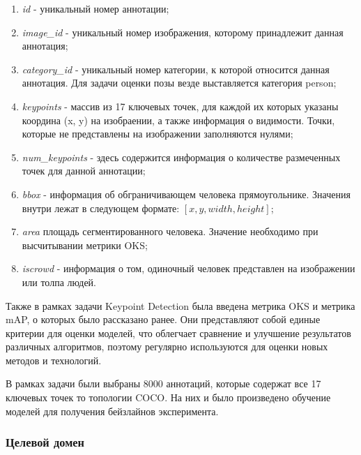 \begin{enumerate}

\item \textit{id} - уникальный номер аннотации;

\item \textit{image\_id} - уникальный номер изображения, которому принадлежит данная аннотация;

\item \textit{category\_id} - уникальный номер категории, к которой относится данная аннотация. Для задачи оценки позы везде выставляется категория person;

\item \textit{keypoints} - массив из 17 ключевых точек, для каждой их которых указаны координа (x, y) на изобраении, а также информация о видимости. Точки, которые не представлены на изображении заполняются нулями;

\item \textit{num\_keypoints} - здесь содержится информация о количестве размеченных точек для данной аннотации;

\item \textit{bbox} - информация об обграничивающем человека прямоугольнике. Значения внутри лежат в следующем формате: $[x, y, width, height]$;

\item \textit{area} площадь сегментированного человека. Значение необходимо при высчитывании метрики OKS;

\item \textit{iscrowd} - информация о том, одиночный человек представлен на изображении или толпа людей.

\end{enumerate}

Также в рамках задачи Keypoint Detection была введена метрика OKS и метрика mAP, о которых было рассказано ранее. Они представляют собой единые критерии для оценки моделей, что облегчает сравнение и улучшение результатов различных алгоритмов, поэтому регулярно используются для оценки  новых методов и технологий.

В рамках задачи были выбраны 8000 аннотаций, которые содержат все 17 ключевых точек то топологии COCO. На них и было произведено обучение моделей для получения бейзлайнов эксперимента.

\subsubsection*{Целевой домен}

